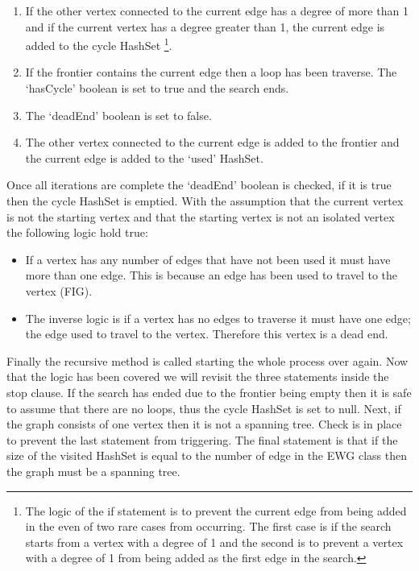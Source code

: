 \documentclass{AISB2008}
\begin{document}
\begin{enumerate}
\item If the other vertex connected to the current edge has a degree of more than 1 and if the current vertex has a degree greater than 1, the current edge is added to the cycle HashSet \footnote{The logic of the if statement is to prevent the current edge from being added in the even of two rare cases from occurring. The first case is if the search starts from a vertex with a degree of 1 and the second is to prevent a vertex with a degree of 1 from being added as the first edge in the search.}.
\item If the frontier contains the current edge then a loop has been traverse. The ‘hasCycle’ boolean is set to true and the search ends.
\item The ‘deadEnd’ boolean is set to false.
\item The other vertex connected to the current edge is added to the frontier and the current edge is added to the ‘used’ HashSet.
\end{enumerate}

Once all iterations are complete the ‘deadEnd’ boolean is checked, if it is true then the cycle HashSet is emptied. With the assumption that the current vertex is not the starting vertex and that the starting vertex is not an isolated vertex the following logic hold true:

\begin{itemize}
\item If a vertex has any number of edges that have not been used it must have more than one edge. This is because an edge has been used to travel to the vertex (FIG). 
\item The inverse logic is if a vertex has no edges to traverse it must have one edge; the edge used to travel to the vertex. Therefore this vertex is a dead end.
\end{itemize}

Finally the recursive method is called starting the whole process over again. Now that the logic has been covered we will revisit the three statements inside the stop clause. If the search has ended due to the frontier being empty then it is safe to assume that there are no loops, thus the cycle HashSet is set to null. Next, if the graph consists of one vertex then it is not a spanning tree. Check is in place to prevent the last statement from triggering. The final statement is that if the size of the visited HashSet is equal to the number of edge in the EWG class then the graph must be a spanning tree.
\end{document}
